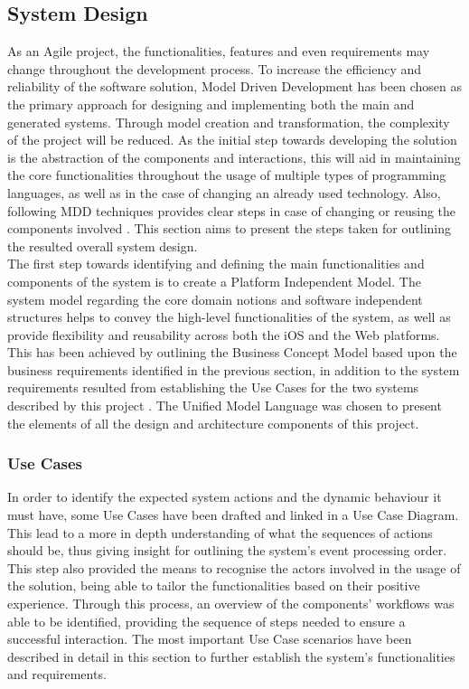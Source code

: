\subsection{System Design}
As an Agile project, the functionalities, features and even requirements may change throughout the development process. To increase the efficiency and reliability of the software solution, Model Driven Development has been chosen as the primary approach for designing and implementing both the main and generated systems. Through model creation and transformation, the complexity of the project will be reduced. As the initial step towards developing the solution is the abstraction of the components and interactions, this will aid in maintaining the core functionalities throughout the usage of multiple types of programming languages, as well as in the case of changing an already used technology. Also, following MDD techniques provides clear steps in case of changing or reusing the components involved \cite{lano_2009}. This section aims to present the steps taken for outlining the resulted overall system design.\\

The first step towards identifying and defining the main functionalities and components of the system is to create a Platform Independent Model. The system model regarding the core domain notions and software independent structures helps to convey the high-level functionalities of the system, as well as provide flexibility and reusability across both the iOS and the Web platforms. This has been achieved by outlining the Business Concept Model based upon the business requirements identified in the previous section, in addition to the system requirements resulted from establishing the Use Cases for the two systems described by this project \cite{sastry_2017}. The Unified Model Language was chosen to present the elements of all the design and architecture components of this project.

\subsubsection{Use Cases}

In order to identify the expected system actions and the dynamic behaviour it must have, some Use Cases have been drafted and linked in a Use Case Diagram. This lead to a more in depth understanding of what the sequences of actions should be, thus giving insight for outlining the system's event processing order. This step also provided the means to recognise the actors involved in the usage of the solution, being able to tailor the functionalities based on their positive experience. Through this process, an overview of the components' workflows was able to be identified, providing the sequence of steps needed to ensure a successful interaction. The most important Use Case scenarios have been described in detail in this section to further establish the system's functionalities and requirements.\\


